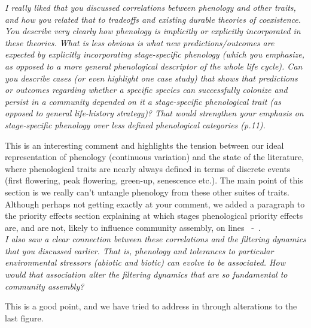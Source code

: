 \documentclass[11pt]{article}
\newcommand{\lr}[1]{~\lineref{#1}}
\begin{document}
\emph{I really liked that you discussed correlations between phenology and other traits, and how you related that to tradeoffs and existing durable theories of coexistence. You describe very clearly how phenology is implicitly or explicitly incorporated in these theories. What is less obvious is what new predictions/outcomes are expected by explicitly incorporating stage-specific phenology (which you emphasize, as opposed to a more general phenological descriptor of the whole life cycle). Can you describe cases (or even highlight one case study) that shows that predictions or outcomes regarding whether a specific species can successfully colonize and persist in a community depended on it a stage-specific phenological trait (as opposed to general life-history strategy)? That would strengthen your emphasis on stage-specific phenology over less defined phenological categories (p.11).}

This is an interesting comment and highlights the tension between our ideal representation of phenology (continuous variation) and the state of the literature, where phenological traits are nearly always defined in terms of discrete events (first flowering, peak flowering, green-up, senescence etc.). The main point of this section is we really can't untangle phenology from these other suites of traits.
Although perhaps not getting exactly at your comment, we added a paragraph to the priority effects section explaining at which stages phenological priority effects are, and are not, likely to influence community assembly, on lines\lr{stage1} -\lr{stage2}.\\ %

\emph{I also saw a clear connection between these correlations and the filtering dynamics that you discussed earlier. That is, phenology and tolerances to particular environmental stressors (abiotic and biotic) can evolve to be associated. How would that association alter the filtering dynamics that are so fundamental to community assembly?}

This is a good point, and we have tried to address in through alterations to the last figure.\\
\end{document}
